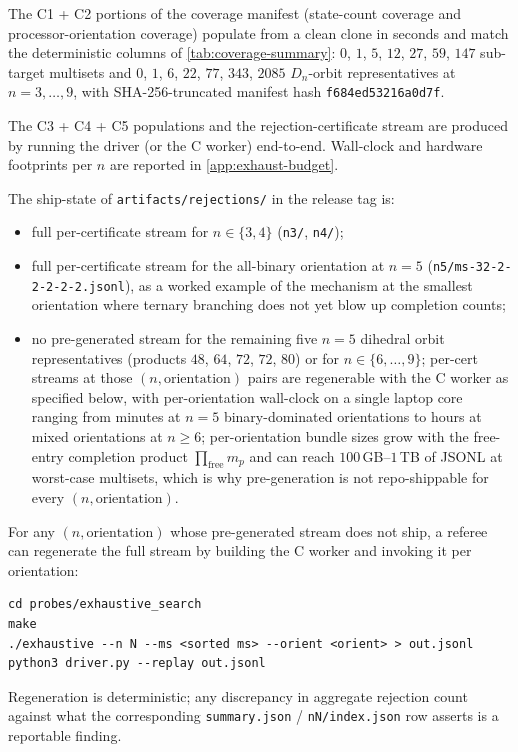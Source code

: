 \documentclass[11pt,a4paper]{article}
\theoremstyle{plain}
\theoremstyle{definition}
\begin{document}
The C1 + C2 portions of the coverage manifest (state-count
coverage and processor-orientation coverage) populate from a
clean clone in seconds and match the deterministic columns of
\cref{tab:coverage-summary}: $0$, $1$, $5$, $12$, $27$, $59$,
$147$ sub-target multisets and $0$, $1$, $6$, $22$, $77$, $343$,
$2085$ $D_n$-orbit representatives at $n = 3, \ldots, 9$, with
SHA-256-truncated manifest hash \texttt{f684ed53216a0d7f}.

The C3 + C4 + C5 populations and the rejection-certificate stream
are produced by running the driver (or the C worker) end-to-end.
Wall-clock and hardware footprints per $n$ are reported in
\cref{app:exhaust-budget}.

The ship-state of \texttt{artifacts/rejections/} in the release
tag is:
\begin{itemize}[leftmargin=*]
\item full per-certificate stream for $n \in \{3, 4\}$
(\texttt{n3/}, \texttt{n4/});
\item full per-certificate stream for the all-binary
orientation at $n = 5$ (\texttt{n5/ms-32-2-2-2-2-2.jsonl}), as a
worked example of the mechanism at the smallest orientation where
ternary branching does not yet blow up completion counts;
\item no pre-generated stream for the remaining five
$n = 5$ dihedral orbit representatives (products $48$, $64$, $72$,
$72$, $80$) or for $n \in \{6, \ldots, 9\}$; per-cert streams at
those $(n, \text{orientation})$ pairs are regenerable with the C
worker as specified below, with per-orientation wall-clock on a
single laptop core ranging from minutes at $n = 5$ binary-dominated
orientations to hours at mixed orientations at $n \ge 6$;
per-orientation bundle sizes grow with the free-entry completion
product $\prod_{\mathrm{free}} m_p$ and can reach
$100\,$GB--$1\,$TB of JSONL at worst-case multisets, which is why
pre-generation is not repo-shippable for every $(n, \text{orientation})$.
\end{itemize}

For any $(n, \text{orientation})$ whose pre-generated stream does
not ship, a referee can regenerate the full stream by building
the C worker and invoking it per orientation:
\begin{verbatim}
cd probes/exhaustive_search
make
./exhaustive --n N --ms <sorted ms> --orient <orient> > out.jsonl
python3 driver.py --replay out.jsonl
\end{verbatim}
Regeneration is deterministic; any discrepancy in aggregate
rejection count against what the corresponding
\texttt{summary.json} / \texttt{nN/index.json} row asserts is a
reportable finding.
\end{document}
